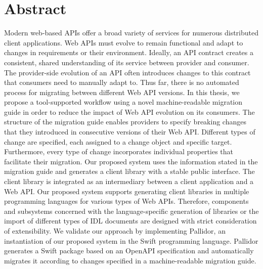 \chapter{Abstract}

Modern web-based APIs offer a broad variety of services for numerous distributed client applications. Web APIs must evolve to remain functional and adapt to changes in requirements or their environment. Ideally, an API contract creates a consistent, shared understanding of its service between provider and consumer. The provider-side evolution of an API often introduces changes to this contract that consumers need to manually adapt to. Thus far, there is no automated process for migrating between different Web API versions. In this thesis, we propose a tool-supported workflow using a novel machine-readable migration guide in order to reduce the impact of Web API evolution on its consumers. The structure of the migration guide enables providers to specify breaking changes that they introduced in consecutive versions of their Web API. Different types of change are specified, each assigned to a change object and specific target. Furthermore, every type of change incorporates individual properties that facilitate their migration. Our proposed system uses the information stated in the migration guide and generates a client library with a stable public interface. The client library is integrated as an intermediary between a client application and a Web API. Our proposed system supports generating client libraries in multiple programming languages for various types of Web APIs. Therefore, components and subsystems concerned with the language-specific generation of libraries or the import of different types of IDL documents are designed with strict consideration of extensibility. We validate our approach by implementing Pallidor, an instantiation of our proposed system in the Swift programming language. Pallidor generates a Swift package based on an OpenAPI specification and automatically migrates it according to changes specified in a machine-readable migration guide. 